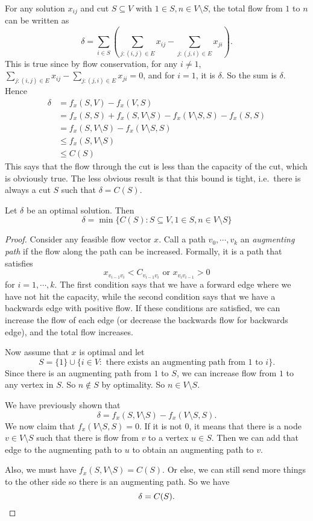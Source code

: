 \documentclass[a4paper]{article}
\begin{document}
For any solution $x_{ij}$ and cut $S\subseteq V$ with $1\in S, n\in V\setminus S$, the total flow from $1$ to $n$ can be written as
\[
  \delta = \sum_{i\in S}\left(\sum_{j: (i, j)\in E}x_{ij} - \sum_{j: (j, i)\in E}x_{ji}\right).
\]
This is true since by flow conservation, for any $i \not= 1$, $\sum\limits_{j: (i, j) \in E}x_{ij} - \sum\limits_{j: (j, i)\in E}x_{ji} = 0$, and for $i = 1$, it is $\delta$. So the sum is $\delta$. Hence
\begin{align*}
  \delta &= f_x(S, V) - f_x(V, S)\\
  &= f_x(S, S) + f_x(S, V\setminus S) - f_x(V\setminus S, S) - f_x(S, S)\\
  &= f_x(S, V\setminus S) - f_x(V\setminus S, S)\\
  &\leq f_x(S, V\setminus S)\\
  &\leq C(S)
\end{align*}
This says that the flow through the cut is less than the capacity of the cut, which is obviously true. The less obvious result is that this bound is tight, i.e.\ there is always a cut $S$ such that $\delta = C(S)$.

\begin{thm}
  Let $\delta$ be an optimal solution. Then
  \[
    \delta = \min\{C(S): S\subseteq V, 1\in S, n \in V\setminus S\}
  \]
\end{thm}

\begin{proof}
  Consider any feasible flow vector $x$. Call a path $v_0, \cdots, v_k$ an \emph{augmenting path} if the flow along the path can be increased. Formally, it is a path that satisfies
  \[
    x_{v_{i - 1}v_i} < C_{v_{i - 1}v_i}\text{ or }x_{v_iv_{i - 1}} > 0
  \]
  for $i = 1,\cdots, k$. The first condition says that we have a forward edge where we have not hit the capacity, while the second condition says that we have a backwards edge with positive flow. If these conditions are satisfied, we can increase the flow of each edge (or decrease the backwards flow for backwards edge), and the total flow increases.

  Now assume that $x$ is optimal and let
  \[
    S = \{1\}\cup \{i\in V: \text{ there exists an augmenting path from $1$ to $i$}\}.
  \]
  Since there is an augmenting path from $1$ to $S$, we can increase flow from $1$ to any vertex in $S$. So $n \not\in S$ by optimality. So $n\in V\setminus S$.

  We have previously shown that
  \[
    \delta = f_x(S, V\setminus S) - f_x(V\setminus S, S).
  \]
  We now claim that $f_x(V\setminus S, S) = 0$. If it is not $0$, it means that there is a node $v\in V\setminus S$ such that there is flow from $v$ to a vertex $u\in S$. Then we can add that edge to the augmenting path to $u$ to obtain an augmenting path to $v$.

  Also, we must have $f_x(S, V\setminus S) = C(S)$. Or else, we can still send more things to the other side so there is an augmenting path. So we have
  \[
    \delta = C(S).\qedhere
  \]
\end{proof}
\end{document}
